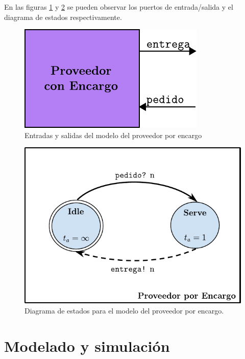 \documentclass[10pt]{article}
\begin{document}
En las figuras \ref{fig:PE-esquematico} y \ref{fig:PE-estados} se pueden observar los puertos de entrada/salida y el diagrama de estados respectivamente.

\begin{figure}[htbp]
	\centering
	\includegraphics{img/PE-esquematico}
	\caption{Entradas y salidas del modelo del proveedor por encargo}
	\label{fig:PE-esquematico}
\end{figure}

\begin{figure}[htbp]
	\centering
	\includegraphics{img/proveedorEncargodevsgraph}
	\caption{Diagrama de estados para el modelo del proveedor por encargo.}
	\label{fig:PE-estados}
\end{figure}





\section{Modelado y simulación}
\end{document}
